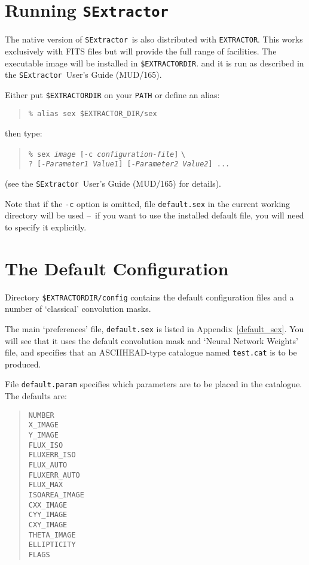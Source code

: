 \documentclass[twoside,11pt]{article}
\newcommand{\htmladdnormallink}[2]{#1}
\newcommand{\latex}[1]{#1}
\newcommand{\xlabel}[1]{}
\renewcommand{\_}{\texttt{\symbol{95}}}
\newcommand{\EXTRACTOR}{\texttt{EXTRACTOR}}
\newcommand{\SExtractor}{\texttt{SExtractor}}
\newcommand{\MUD}{mud165.ps}
\newcommand{\dash}{--}
\newcommand{\dash}{-}
\begin{document}
\section{\label{running_sextractor}\xlabel{running_sextractor}Running \SExtractor}
The native version of \SExtractor\ is also distributed with \EXTRACTOR.
This works exclusively with FITS files but will provide the full range of
facilities. The executable image will be installed in \texttt{\$EXTRACTOR\_DIR}.
and it is run as described in the
\htmladdnormallink{\SExtractor\ User's Guide}{\MUD}\latex{ (MUD/165)}.

Either put \texttt{\$EXTRACTOR\_DIR} on your \texttt{PATH} or define an alias:
\begin{quote} \begin{verbatim}
% alias sex $EXTRACTOR_DIR/sex
\end{verbatim}\end{quote}
then type:
\begin{quote}
\texttt{\% sex \textit{image} [-c \textit{configuration-file}]} \verb!\! \\
\texttt{? [-\textit{Parameter1 Value1}] [-\textit{Parameter2 Value2}] ...}
\end{quote}
(see the 
\htmladdnormallink{\SExtractor\ User's Guide}{\MUD}\latex{ (MUD/165)}
for details).

Note that if the \texttt{-c} option is omitted, file \texttt{default.sex} in the
current working directory will be used \dash\ if you want to use the installed
default file, you will need to specify it explicitly.

\section{\label{defaults}\xlabel{the_default_configuration}The Default Configuration}
Directory \texttt{\$EXTRACTOR\_DIR/config} contains the default configuration
files and a number of `classical' convolution masks.

The main `preferences' file, \texttt{default.sex} is listed in
Appendix~\ref{default_sex}.
You will see that it uses the default convolution mask and `Neural Network
Weights' file, and specifies that an ASCII\_HEAD-type catalogue named
\texttt{test.cat} is to be produced.

File \texttt{default.param} specifies which parameters are to be placed in the 
catalogue. The defaults are:
\begin{quote}\begin{verbatim}
NUMBER
X_IMAGE
Y_IMAGE
FLUX_ISO
FLUXERR_ISO
FLUX_AUTO
FLUXERR_AUTO
FLUX_MAX
ISOAREA_IMAGE
CXX_IMAGE
CYY_IMAGE
CXY_IMAGE
THETA_IMAGE
ELLIPTICITY
FLAGS
\end{verbatim}\end{quote}
\end{document}
